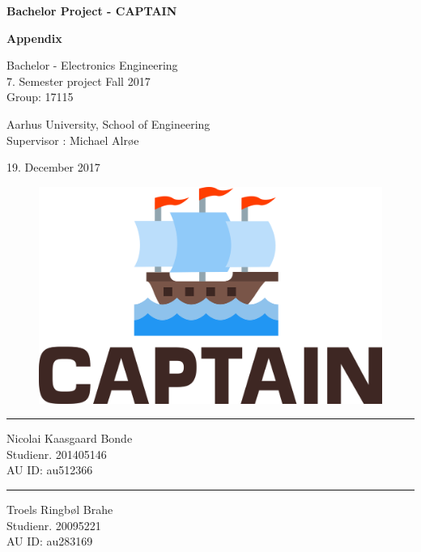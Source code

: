 \begin{titlingpage}
		
	\begin{center}
			{\huge\bfseries Bachelor Project - CAPTAIN}\\
			\vspace{10pt}
			
			{\Huge\bfseries Appendix}\\
			
			\vspace{20pt}
			
			{Bachelor - Electronics Engineering}\\
			{\large 7. Semester project Fall 2017}\\
			{Group: 17115}
			
			\vspace{10pt}
			
			Aarhus University, School of Engineering\\
			Supervisor : Michael Alrøe
			\vspace{10pt}
			
			19. December 2017
			\vspace{10pt}
			\begin{figure}[H]
				\centering
				\includegraphics[max width=0.7\linewidth]{Images/logo.png}
			\end{figure}
			\vspace{50pt}
			\begin{minipage}{0.25\linewidth}
				\centering
				\hrule
				\vspace{12pt}
				Nicolai Kaasgaard Bonde\\
				Studienr. 201405146\\
				AU ID: au512366
			\end{minipage}
			\hspace{50pt}
			\begin{minipage}{0.25\linewidth}
				\centering
				\hrule
				\vspace{12pt}
				Troels Ringbøl Brahe\\
				Studienr. 20095221\\
				AU ID: au283169
			\end{minipage}
	\end{center}
\end{titlingpage}